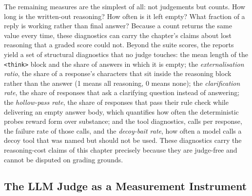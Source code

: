 The remaining measures are the simplest of all: not judgements but counts. How long is the written-out reasoning? How often is it left empty? What fraction of a reply is working rather than final answer? Because a count returns the same value every time, these diagnostics can carry the chapter's claims about lost reasoning that a graded score could not. Beyond the suite scores, the reports yield a set of structural diagnostics that no judge touches: the mean length of the \texttt{<think>} block and the share of answers in which it is empty; the \emph{externalisation ratio}, the share of a response's characters that sit inside the reasoning block rather than the answer (1 means all reasoning, 0 means none); the \emph{clarification rate}, the share of responses that ask a clarifying question instead of answering; the \emph{hollow-pass rate}, the share of responses that pass their rule check while delivering an empty answer body, which quantifies how often the deterministic probes reward form over substance; and the tool diagnostics, calls per response, the failure rate of those calls, and the \emph{decoy-bait rate}, how often a model calls a decoy tool that was named but should not be used. These diagnostics carry the reasoning-cost claims of this chapter precisely because they are judge-free and cannot be disputed on grading grounds.

\subsection{The LLM Judge as a Measurement Instrument}
\label{subsec:mr-judge-validity}

